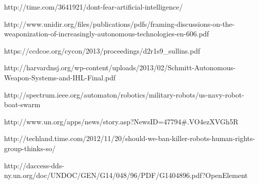 \documentclass{report}
\begin{document}
http://time.com/3641921/dont-fear-artificial-intelligence/

http://www.unidir.org/files/publications/pdfs/framing-discussions-on-the-weaponization-of-increasingly-autonomous-technologies-en-606.pdf

https://ccdcoe.org/cycon/2013/proceedings/d2r1s9_sullins.pdf

http://harvardnsj.org/wp-content/uploads/2013/02/Schmitt-Autonomous-Weapon-Systems-and-IHL-Final.pdf

http://spectrum.ieee.org/automaton/robotics/military-robots/us-navy-robot-boat-swarm

http://www.un.org/apps/news/story.asp?NewsID=47794#.VO4ezXVGh5R 

http://techland.time.com/2012/11/20/should-we-ban-killer-robots-human-rights-group-thinks-so/

http://daccess-dds-ny.un.org/doc/UNDOC/GEN/G14/048/96/PDF/G1404896.pdf?OpenElement
\end{document}
